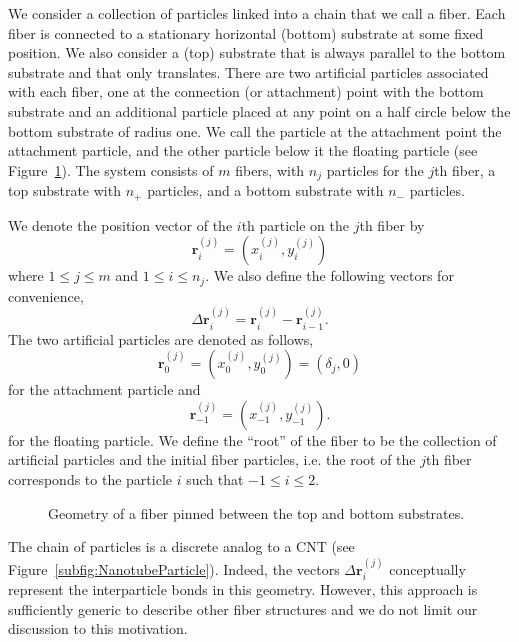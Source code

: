    We consider a collection of particles linked into a chain that we call a fiber. Each fiber is connected to a stationary horizontal (bottom) substrate at some fixed position. We also consider a (top) substrate that is always parallel to the bottom substrate and that only translates. There are two artificial particles associated with each fiber, one at the connection (or attachment) point with the bottom substrate and an additional particle placed at any point on a half circle below the bottom substrate of radius one. We call the particle at the attachment point the attachment particle, and the other particle below it the floating particle (see Figure~\ref{fig:Geometry}). The system consists of $m$ fibers, with $n_j$ particles for the $j$th fiber, a top substrate with $n_+$ particles, and a bottom substrate with $n_-$ particles.

We denote the position vector of the $i$th particle on the $j$th fiber by
\begin{equation}
	\textbf{r}_i^{(j)} = (x_i^{(j)},y_i^{(j)})
\end{equation}
where $1 \leq j \leq m$ and $1 \leq i \leq n_j$. We also define the following vectors for convenience,
\begin{equation}
	\Delta \textbf{r}_i^{(j)} = \textbf{r}_i^{(j)} - \textbf{r}_{i-1}^{(j)}.
\end{equation}
The two artificial particles are denoted as follows,
\begin{equation}
	\textbf{r}_0^{(j)} = (x_0^{(j)},y_0^{(j)}) = (\delta_j,0)
\end{equation}
for the attachment particle and
\begin{equation}
	\textbf{r}_{-1}^{(j)} = (x_{-1}^{(j)},y_{-1}^{(j)}).
\end{equation}
for the floating particle. We define the ``root'' of the fiber to be the collection of artificial particles and the initial fiber particles, i.e. the root of the $j$th fiber corresponds to the particle $i$ such that $-1 \leq i \leq 2$.

	\begin{figure}[t]
		\begin{center}
			
		\end{center}		
		\caption{Geometry of a fiber pinned between the top and bottom substrates.
		\label{fig:Geometry}}
	\end{figure}


	The chain of particles is a discrete analog to a CNT (see Figure~\ref{subfig:NanotubeParticle}). Indeed, the vectors $\Delta \textbf{r}_i^{(j)}$ conceptually represent the interparticle bonds in this geometry. However, this approach is sufficiently generic to describe other fiber structures and we do not limit our discussion to this motivation.
	

